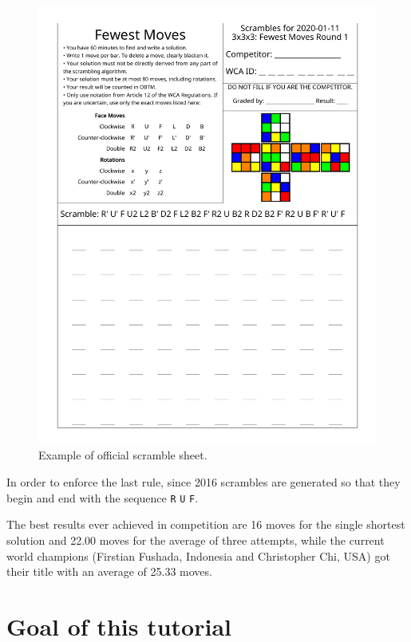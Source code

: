 \documentclass[11pt,a4paper]{book}
\newcommand{\p}{\textquotesingle}
\newcommand{\m}{\texttt}
\begin{document}
\begin{figure}
\begin{center}
\includegraphics[scale=0.7]{img/example.pdf}
\end{center}
\caption{Example of official scramble sheet.}
\end{figure}

In order to enforce the last rule, since 2016 scrambles are generated so that they begin and end with the sequence \m{R\p} \m U \m F.

The best results ever achieved in competition are 16 moves for the single shortest solution and 22.00 moves for the average of three attempts, while the current world champions (Firstian Fushada, Indonesia and Christopher Chi, USA) got their title with an average of 25.33 moves.

\section*{Goal of this tutorial}
\end{document}
